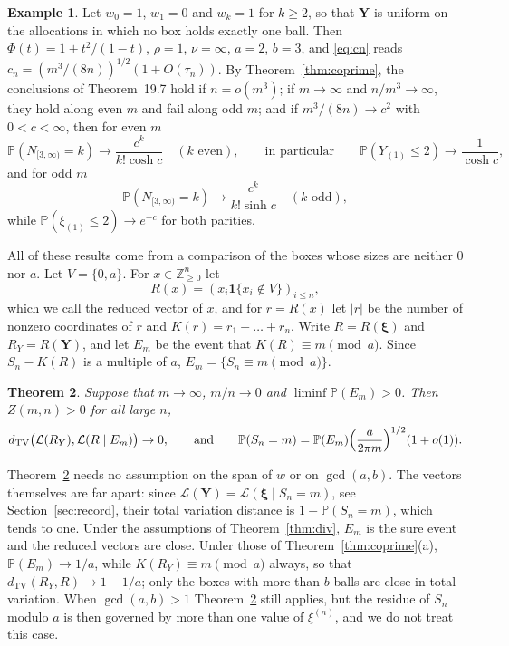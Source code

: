 \documentclass[11pt]{amsart}
\newtheorem{theorem}{Theorem}[section]
\theoremstyle{definition}
\newtheorem{example}[theorem]{Example}
\theoremstyle{remark}
\numberwithin{equation}{section}
\newcommand{\Pp}{\mathbb P}
\newcommand{\Z}{\mathbb Z}
\newcommand{\cL}{\mathcal L}
\newcommand{\dtv}{d_{\mathrm{TV}}}
\newcommand{\bY}{\mathbf Y}
\newcommand{\bxi}{\boldsymbol\xi}
\newcommand{\one}{\mathbf 1}
\begin{document}
\begin{example}\label{ex:parity}
Let $w_0=1$, $w_1=0$ and $w_k=1$ for $k\ge2$, so that $\bY$ is uniform on the allocations in which no box holds exactly one ball. Then $\Phi(t)=1+t^2/(1-t)$, $\rho=1$, $\nu=\infty$, $a=2$, $b=3$, and \eqref{eq:cn} reads $c_n=(m^3/(8n))^{1/2}(1+O(\tau_n))$. By Theorem~\ref{thm:coprime}, the conclusions of Theorem~19.7 hold if $n=o(m^3)$; if $m\to\infty$ and $n/m^3\to\infty$, they hold along even $m$ and fail along odd $m$; and if $m^3/(8n)\to c^2$ with $0<c<\infty$, then for even $m$
\[
\Pp(N_{[3,\infty)}=k)\to\frac{c^k}{k!\cosh c}\quad(k\text{ even}),\qquad\text{in particular}\qquad\Pp(Y_{(1)}\le2)\to\frac1{\cosh c},
\]
and for odd $m$
\[
\Pp(N_{[3,\infty)}=k)\to\frac{c^k}{k!\sinh c}\quad(k\text{ odd}),
\]
while $\Pp(\xi_{(1)}\le2)\to e^{-c}$ for both parities.
\end{example}

All of these results come from a comparison of the boxes whose sizes are neither $0$ nor $a$. Let $V=\{0,a\}$. For $x\in\Z_{\ge0}^n$ let
\[
R(x)=(x_i\one\{x_i\notin V\})_{i\le n},
\]
which we call the reduced vector of $x$, and for $r=R(x)$ let $|r|$ be the number of nonzero coordinates of $r$ and $K(r)=r_1+\dots+r_n$. Write $R=R(\bxi)$ and $R_Y=R(\bY)$, and let $E_m$ be the event that $K(R)\equiv m\pmod a$. Since $S_n-K(R)$ is a multiple of $a$, $E_m=\{S_n\equiv m\pmod a\}$.

\begin{theorem}\label{thm:record}
Suppose that $m\to\infty$, $m/n\to0$ and $\liminf\Pp(E_m)>0$. Then $Z(m,n)>0$ for all large $n$,
\[
\dtv\bigl(\cL(R_Y),\cL(R\mid E_m)\bigr)\to0,
\qquad\text{and}\qquad
\Pp(S_n=m)=\Pp(E_m)\Bigl(\frac a{2\pi m}\Bigr)^{1/2}(1+o(1)).
\]
\end{theorem}

Theorem~\ref{thm:record} needs no assumption on the span of $w$ or on $\gcd(a,b)$. The vectors themselves are far apart: since $\cL(\bY)=\cL(\bxi\mid S_n=m)$, see Section~\ref{sec:record}, their total variation distance is $1-\Pp(S_n=m)$, which tends to one. Under the assumptions of Theorem~\ref{thm:div}, $E_m$ is the sure event and the reduced vectors are close. Under those of Theorem~\ref{thm:coprime}(a), $\Pp(E_m)\to1/a$, while $K(R_Y)\equiv m\pmod a$ always, so that $\dtv(R_Y,R)\to1-1/a$; only the boxes with more than $b$ balls are close in total variation. When $\gcd(a,b)>1$ Theorem~\ref{thm:record} still applies, but the residue of $S_n$ modulo $a$ is then governed by more than one value of $\xi^{(n)}$, and we do not treat this case.
\end{document}
